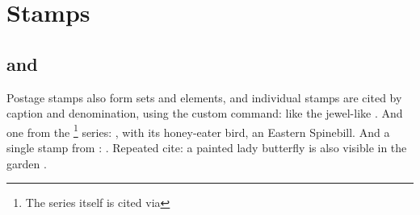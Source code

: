 \section{Stamps}
\subsection{ and }
Postage stamps also form sets and elements, and individual stamps are cited by caption and denomination, using the  custom command: like the jewel-like 
. 
And one from the 
\footnote{The series itself is cited via } series: 
, with its honey-eater bird, an Eastern Spinebill. And a single stamp
 from \citetrackerfalse
 :
 \citetrackertrue
{}.
Repeated cite: a painted lady butterfly is also visible in the garden 
.

